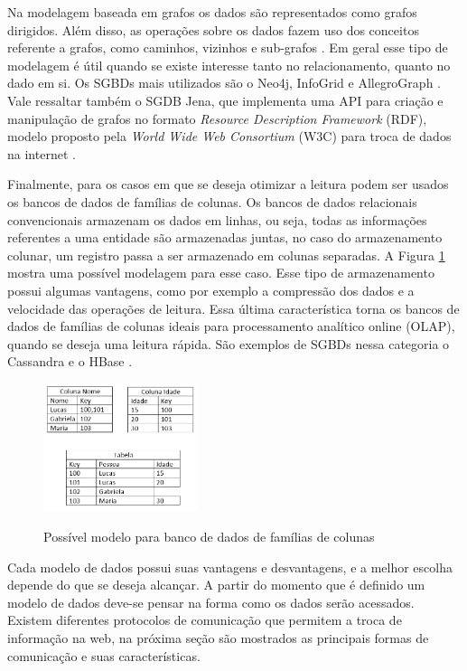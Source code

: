 Na modelagem baseada em grafos os dados são representados como grafos dirigidos. Além disso, 
as operações sobre os dados fazem uso dos conceitos referente a grafos, como caminhos, 
vizinhos e sub-grafos \cite{de2010nosql}. Em geral esse tipo de modelagem é útil 
quando se existe interesse tanto no relacionamento, quanto no dado em si. Os SGBDs mais 
utilizados são o Neo4j, InfoGrid e AllegroGraph \cite{moniruzzaman2013nosql}. Vale ressaltar 
também o SGDB Jena, que implementa uma API para criação e manipulação de grafos no formato 
\textit{Resource Description Framework} (RDF), modelo proposto pela \textit{World Wide Web 
Consortium} (W3C) para troca de dados na internet \cite{mcbride2001jena}.

Finalmente, para os casos em que se deseja otimizar a leitura podem ser usados os bancos de 
dados de famílias de colunas. Os bancos de dados relacionais convencionais armazenam os dados 
em linhas, ou seja, todas as informações referentes a uma entidade são armazenadas juntas, 
no caso do armazenamento colunar, um registro passa a ser armazenado em colunas separadas. 
A Figura \ref{fig:db-colunar} mostra uma possível modelagem para esse caso. Esse tipo de 
armazenamento possui algumas vantagens, como por exemplo a compressão dos dados e a 
velocidade das operações de leitura. Essa última característica torna os bancos de dados de 
famílias de colunas ideais para processamento analítico online (OLAP), quando se deseja uma 
leitura rápida. São exemplos de SGBDs nessa categoria o Cassandra e o HBase 
\cite{de2010nosql}.

\begin{figure}[!htb]
    \centering
    \caption{Possível modelo para banco de dados de famílias de colunas}
    \includegraphics[width=0.4\textwidth]{./04-figuras/db-colunar}
    \label{fig:db-colunar}
\end{figure}


Cada modelo de dados possui suas vantagens e desvantagens, e a melhor escolha depende do que 
se deseja alcançar. A partir do momento que é definido um modelo de dados deve-se pensar na 
forma como os dados serão acessados. Existem diferentes protocolos de comunicação que 
permitem a troca de informação na web, na próxima seção são mostrados as principais formas
de comunicação e suas características.

